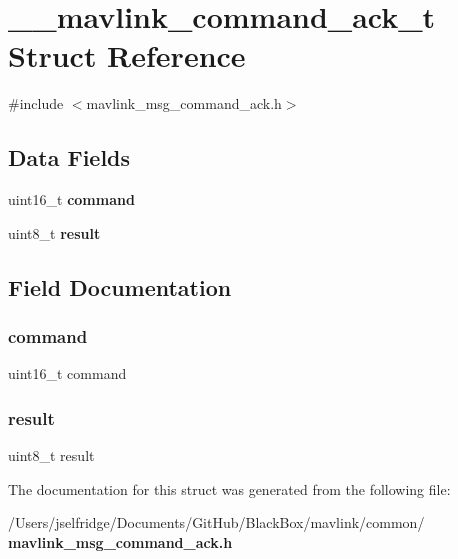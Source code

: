 \section{\+\_\+\+\_\+mavlink\+\_\+command\+\_\+ack\+\_\+t Struct Reference}
\label{struct____mavlink__command__ack__t}


{\ttfamily \#include $<$mavlink\+\_\+msg\+\_\+command\+\_\+ack.\+h$>$}

\subsection*{Data Fields}
\begin{DoxyCompactItemize}
\item 
uint16\+\_\+t \textbf{ command}
\item 
uint8\+\_\+t \textbf{ result}
\end{DoxyCompactItemize}


\subsection{Field Documentation}
\mbox{\label{struct____mavlink__command__ack__t_a4635796d5c7e7a2639b11dfe83718acc}} 
\subsubsection{command}
{\footnotesize\ttfamily uint16\+\_\+t command}

\mbox{\label{struct____mavlink__command__ack__t_a556c80259568976b607ec50f8747d42a}} 
\subsubsection{result}
{\footnotesize\ttfamily uint8\+\_\+t result}



The documentation for this struct was generated from the following file\+:\begin{DoxyCompactItemize}
\item 
/\+Users/jselfridge/\+Documents/\+Git\+Hub/\+Black\+Box/mavlink/common/\textbf{ mavlink\+\_\+msg\+\_\+command\+\_\+ack.\+h}\end{DoxyCompactItemize}
